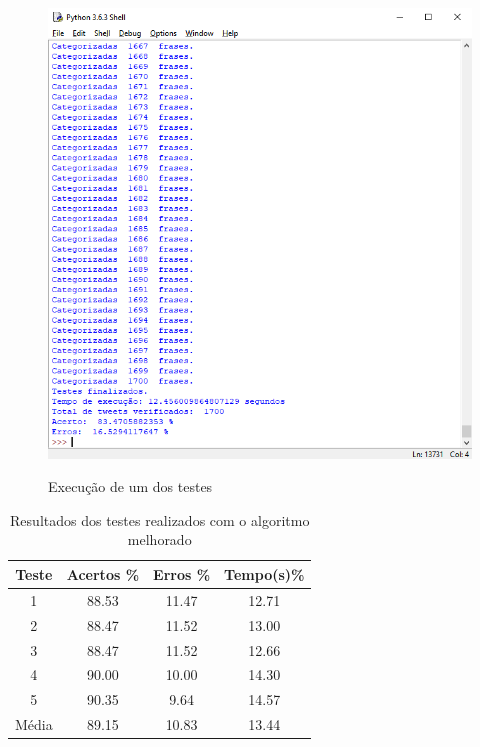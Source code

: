 \documentclass[
article,			%
12pt,				%
a4paper,			%
english,			%
brazil,				%
sumario=tradicional,
twoside
]{abntex2}
\begin{document}
		\begin{figure}[h!]
		\centering
		\caption{Execução de um dos testes}
		\includegraphics[scale=1]{teste1.png}
		\label{fig: teste1}
	\end{figure}
	
	\begin{table}[!h]
		\caption{Resultados dos testes realizados com o algoritmo melhorado}
		\label{tab: testes2}
		\centering
		
		\begin{tabular}{|c|c|c|c|} \hline
			\textbf{Teste} & \textbf{Acertos \%} & \textbf{Erros \%} & \textbf{Tempo(s)\%} \\
			\hline
			1 & 88.53 & 11.47 & 12.71\\
			2 & 88.47 & 11.52 & 13.00\\
			3 & 88.47 & 11.52 & 12.66 \\
			4 & 90.00 & 10.00 & 14.30 \\
			5 & 90.35 & 9.64 & 14.57 \\
			
			\hline
			Média & 89.15 & 10.83 & 13.44\\
			\hline
			
		\end{tabular}
		
	\end{table}
	
	
	
	\newpage
	\nocite{sitenaive}
	
	
	
\end{document}
